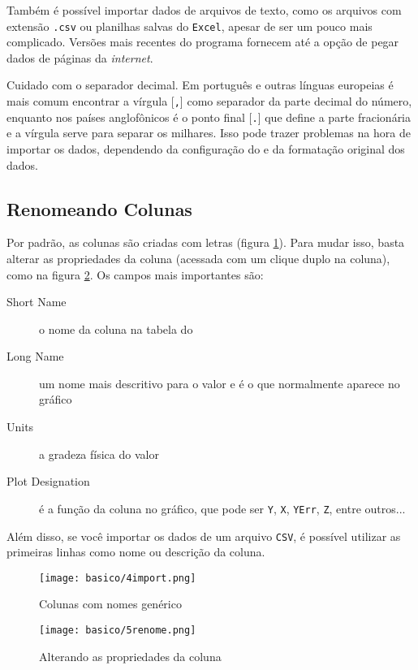     Também é possível importar dados de arquivos de texto, como os arquivos com extensão \texttt{.csv} ou planilhas salvas do \texttt{Excel}, apesar de ser um pouco mais complicado. Versões mais recentes do programa fornecem até a opção de pegar dados de páginas da \textit{internet}.

    \begin{lembrete}
        Cuidado com o separador decimal. Em português e outras línguas europeias é mais comum encontrar a vírgula [\texttt{,}] como separador da parte decimal do número, enquanto nos países anglofônicos é o ponto final [\texttt{.}] que define a parte fracionária e a vírgula serve para separar os milhares. Isso pode trazer problemas na hora de importar os dados, dependendo da configuração do \software e da formatação original dos dados.
    \end{lembrete}


\subsection{Renomeando Colunas} \label{sec:basico:renome}

    Por padrão, as colunas são criadas com letras (figura \ref{fig:basico:importado}). Para mudar isso, basta alterar as propriedades da coluna (acessada com um clique duplo na coluna), como na figura \ref{fig:basico:renomear}. Os campos mais importantes são:

    \begin{description}
        \item[Short Name] o nome da coluna na tabela do \software
        \item[Long Name] um nome mais descritivo para o valor e é o que normalmente aparece no gráfico
        \item[Units] a gradeza física do valor
        \item[Plot Designation] é a função da coluna no gráfico, que pode ser \texttt{Y}, \texttt{X}, \texttt{YErr}, \texttt{Z}, entre outros...
    \end{description}

    Além disso, se você importar os dados de um arquivo \texttt{CSV}, é possível utilizar as primeiras linhas como nome ou descrição da coluna.

    \begin{figure}[htbp]
        \centering
        \texttt{[image: basico/4import.png]}

        \caption{Colunas com nomes genérico}
        \label{fig:basico:importado}
    \end{figure}

    \begin{figure}[htbp]
        \centering
        \texttt{[image: basico/5renome.png]}

        \caption{Alterando as propriedades da coluna}
        \label{fig:basico:renomear}
    \end{figure}
